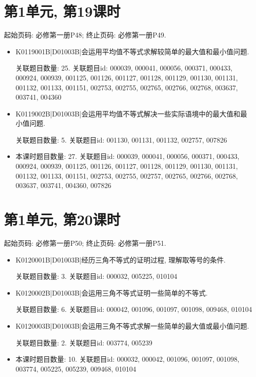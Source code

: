 \section*{第1单元, 第19课时}
起始页码: 必修第一册P48; 终止页码: 必修第一册P49.
\begin{itemize}
\item K0119001B|D01003B|会运用平均值不等式求解较简单的最大值和最小值问题.

关联题目数量: 25. 关联题目id: 000039, 000041, 000056, 000371, 000433, 000924, 000939, 001125, 001126, 001127, 001128, 001129, 001130, 001131, 001132, 001133, 001151, 002753, 002755, 002765, 002766, 002768, 003637, 003741, 004360

\item K0119002B|D01003B|会运用平均值不等式解决一些实际语境中的最大值和最小值问题.

关联题目数量: 5. 关联题目id: 001130, 001131, 001132, 002757, 007826

\item 本课时题目数量: 27. 关联题目id: 000039, 000041, 000056, 000371, 000433, 000924, 000939, 001125, 001126, 001127, 001128, 001129, 001130, 001131, 001132, 001133, 001151, 002753, 002755, 002757, 002765, 002766, 002768, 003637, 003741, 004360, 007826

\end{itemize}

\section*{第1单元, 第20课时}
起始页码: 必修第一册P50; 终止页码: 必修第一册P51.
\begin{itemize}
\item K0120001B|D01003B|经历三角不等式的证明过程, 理解取等号的条件.

关联题目数量: 3. 关联题目id: 000032, 005225, 010104

\item K0120002B|D01003B|会运用三角不等式证明一些简单的不等式.

关联题目数量: 6. 关联题目id: 000042, 001096, 001097, 001098, 009468, 010104

\item K0120003B|D01003B|会运用三角不等式求解一些简单的最大值或最小值问题.

关联题目数量: 2. 关联题目id: 003774, 005239

\item 本课时题目数量: 10. 关联题目id: 000032, 000042, 001096, 001097, 001098, 003774, 005225, 005239, 009468, 010104

\end{itemize}

